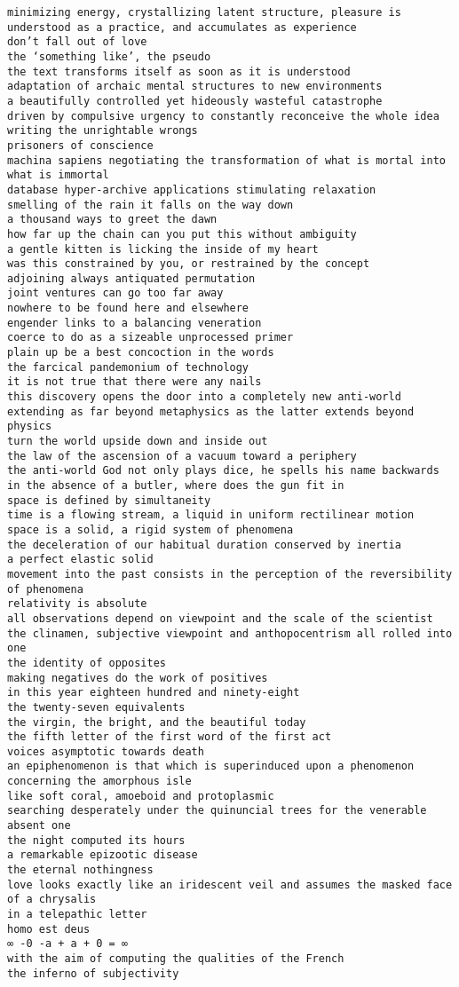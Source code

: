\begin{verbatim}
minimizing energy, crystallizing latent structure, pleasure is understood as a practice, and accumulates as experience
don’t fall out of love
the ‘something like’, the pseudo
the text transforms itself as soon as it is understood
adaptation of archaic mental structures to new environments
a beautifully controlled yet hideously wasteful catastrophe
driven by compulsive urgency to constantly reconceive the whole idea
writing the unrightable wrongs
prisoners of conscience
machina sapiens negotiating the transformation of what is mortal into what is immortal
database hyper-archive applications stimulating relaxation
smelling of the rain it falls on the way down
a thousand ways to greet the dawn
how far up the chain can you put this without ambiguity
a gentle kitten is licking the inside of my heart
was this constrained by you, or restrained by the concept
adjoining always antiquated permutation
joint ventures can go too far away
nowhere to be found here and elsewhere
engender links to a balancing veneration
coerce to do as a sizeable unprocessed primer
plain up be a best concoction in the words
the farcical pandemonium of technology
it is not true that there were any nails
this discovery opens the door into a completely new anti-world
extending as far beyond metaphysics as the latter extends beyond physics
turn the world upside down and inside out
the law of the ascension of a vacuum toward a periphery
the anti-world God not only plays dice, he spells his name backwards
in the absence of a butler, where does the gun fit in
space is defined by simultaneity
time is a flowing stream, a liquid in uniform rectilinear motion
space is a solid, a rigid system of phenomena
the deceleration of our habitual duration conserved by inertia
a perfect elastic solid
movement into the past consists in the perception of the reversibility of phenomena
relativity is absolute
all observations depend on viewpoint and the scale of the scientist
the clinamen, subjective viewpoint and anthopocentrism all rolled into one
the identity of opposites
making negatives do the work of positives
in this year eighteen hundred and ninety-eight
the twenty-seven equivalents
the virgin, the bright, and the beautiful today
the fifth letter of the first word of the first act
voices asymptotic towards death
an epiphenomenon is that which is superinduced upon a phenomenon
concerning the amorphous isle
like soft coral, amoeboid and protoplasmic
searching desperately under the quinuncial trees for the venerable absent one
the night computed its hours
a remarkable epizootic disease
the eternal nothingness
love looks exactly like an iridescent veil and assumes the masked face of a chrysalis
in a telepathic letter
homo est deus
∞ -0 -a + a + 0 = ∞
with the aim of computing the qualities of the French
the inferno of subjectivity
\end{verbatim}


